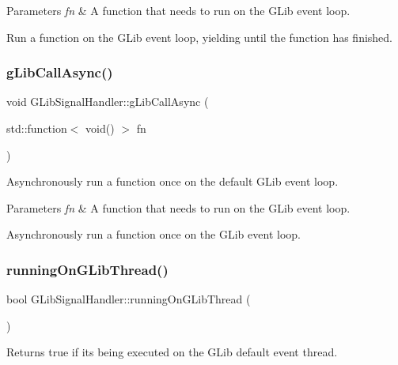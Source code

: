 \begin{DoxyParams}{Parameters}
{\em fn} & A function that needs to run on the G\+Lib event loop.\\
\hline
\end{DoxyParams}
Run a function on the G\+Lib event loop, yielding until the function has finished. \mbox{\label{classGLibSignalHandler_a4d9f6408798f02a193ac21847712f981}} 
\subsubsection{\texorpdfstring{g\+Lib\+Call\+Async()}{gLibCallAsync()}}
{\footnotesize\ttfamily void G\+Lib\+Signal\+Handler\+::g\+Lib\+Call\+Async (\begin{DoxyParamCaption}\item[{std\+::function$<$ void() $>$}]{fn }\end{DoxyParamCaption})}

Asynchronously run a function once on the default G\+Lib event loop.


\begin{DoxyParams}{Parameters}
{\em fn} & A function that needs to run on the G\+Lib event loop.\\
\hline
\end{DoxyParams}
Asynchronously run a function once on the G\+Lib event loop. \mbox{\label{classGLibSignalHandler_a9456898f16d7cb736a591099187637e4}} 
\subsubsection{\texorpdfstring{running\+On\+G\+Lib\+Thread()}{runningOnGLibThread()}}
{\footnotesize\ttfamily bool G\+Lib\+Signal\+Handler\+::running\+On\+G\+Lib\+Thread (\begin{DoxyParamCaption}{ }\end{DoxyParamCaption})}

Returns true if it\textquotesingle{}s being executed on the G\+Lib default event thread.

